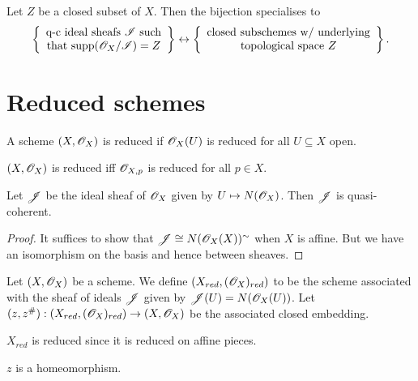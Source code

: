 \documentclass{memoir}
\begin{document}
\begin{remark}
    Let $Z$ be a closed subset of $X$.
    Then the bijection specialises to
    \begin{equation}
        \left\{\begin{array}{c}\text{q-c ideal sheafs } \mathscr{I} \text{ such} \\ \text{that } \text{supp}(\mathscr{O}_X/\mathscr{I}) = Z\end{array}\right\} \leftrightarrow \left\{\begin{array}{c}\text{closed subschemes w/ underlying} \\ \text{topological space } Z \end{array}\right\}.
    \end{equation}
\end{remark}
\section{Reduced schemes}
\begin{definition}
    A scheme $(X,\mathscr{O}_X)$ is reduced if $\mathscr{O}_X(U)$ is reduced for all $U\subseteq X$ open.
\end{definition}
\begin{lemma}
    $(X,\mathscr{O}_X)$ is reduced iff $\mathscr{O}_{X,p}$ is reduced for all $p\in X$.
\end{lemma}
\begin{lemma}
    Let $\mathscr{J}$ be the ideal sheaf of $\mathscr{O}_X$ given by $U\mapsto N(\mathscr{O}_X)$.
    Then $\mathscr{J}$ is quasi-coherent.
\end{lemma}
\begin{proof}
    It suffices to show that $\mathscr{J}\cong N(\mathscr{O}_X(X))^\sim$ when $X$ is affine.
    But we have an isomorphism on the basis and hence between sheaves.
\end{proof}
\begin{definition}
    Let $(X,\mathscr{O}_X)$ be a scheme. 
    We define $(X_{red},(\mathscr{O}_X)_{red})$ to be the scheme associated with the sheaf of ideals $\mathscr{J}$ given by $\mathscr{J}(U) = N(\mathscr{O}_X(U))$.
    Let $(z,z^\#):(X_{red},(\mathscr{O}_X)_{red})\to (X,\mathscr{O}_X)$ be the associated closed embedding.
\end{definition}
\begin{remark}
    $X_{red}$ is reduced since it is reduced on affine pieces.
\end{remark}
\begin{proposition}
    $z$ is a homeomorphism.
\end{proposition}
\end{document}
